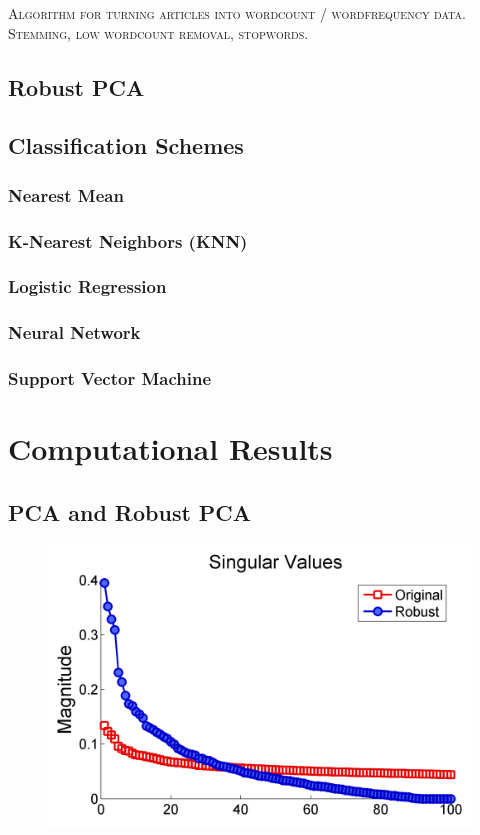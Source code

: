 \documentclass[12pt]{article}
\newcommand{\comment}[1]{\textsc{\color[rgb]{1,0,0}#1}}
\begin{document}
\comment{Algorithm for turning articles into wordcount / wordfrequency data. Stemming, low wordcount removal, stopwords.}

\subsection{Robust PCA}

\subsection{Classification Schemes}

\subsubsection{Nearest Mean}

\subsubsection{K-Nearest Neighbors (KNN)}

\subsubsection{Logistic Regression}

\subsubsection{Neural Network}

\subsubsection{Support Vector Machine}

\section{Computational Results}

\subsection{PCA and Robust PCA}
\begin{figure}[H]
\centering
\includegraphics[width=.6\textwidth]{figures/singularvaluescompare}
\end{figure}
\end{document}
